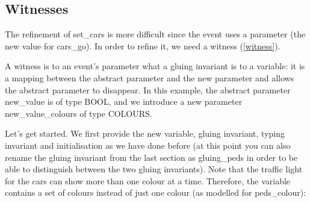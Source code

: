 \subsection{Witnesses}
\label{tut_extend_traffic_witnesses}

The refinement of \textsf{set\_cars} is more difficult since the event uses a parameter (the new value for \textsf{cars\_go}).  In order to refine it, we need a witness (\ref{witness}).

A witness is to an event's parameter what a gluing invariant is to a variable: it is a mapping between the abstract parameter and the new parameter and allows the abstract parameter to disappear.  In this example, the abstract parameter \textsf{new\_value} is of type \textsf{BOOL}, and we introduce a new parameter \textsf{new\_value\_colours} of type \textsf{COLOURS}.


Let's get started.  We first provide the new variable, gluing invariant, typing invariant and initialisation as we have done before (at this point you can also rename the gluing invariant from the last section as \textsf{gluing\_peds} in order to be able to distinguish between the two gluing invariants).  Note that the traffic light for the cars can show more than one colour at a time.  Therefore, the variable contains a set of colours instead of just one colour (as modelled for \textsf{peds\_colour}):


